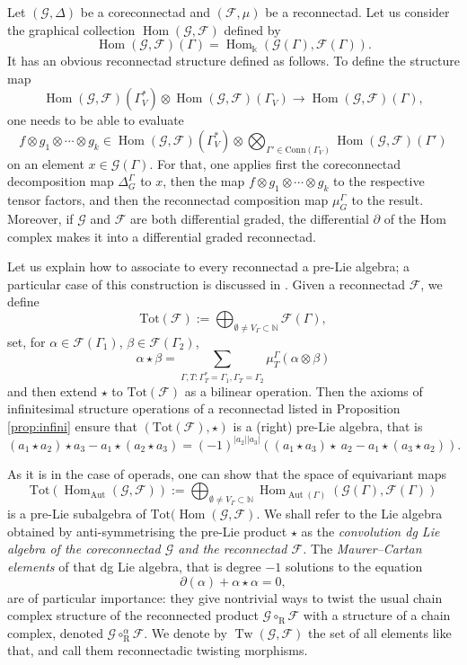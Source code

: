\documentclass[11pt]{article}
\theoremstyle{definition}
\numberwithin{equation}{section}
\newcommand\calF{\mathcal{F}}
\newcommand\calG{\mathcal{G}}
\DeclareMathOperator{\rmR}{\mathrm{R}}
\DeclareMathOperator{\Tw}{Tw}
\DeclareMathOperator{\Aut}{Aut}
\DeclareMathOperator{\Hom}{Hom}
\newcommand\kk{\Bbbk}
\begin{document}
Let $(\calG,\Delta)$ be a coreconnectad and $(\calF,\mu)$ be a reconnectad. Let us consider the graphical collection $\Hom(\calG,\calF)$ defined by
 \[
\Hom(\calG,\calF)(\Gamma)=\Hom_{\kk}(\calG(\Gamma),\calF(\Gamma)). 
 \]
It has an obvious reconnectad structure defined as follows. To define the structure map
 \[
\Hom(\calG,\calF)(\Gamma^*_V)\otimes \Hom(\calG,\calF)(\Gamma_V)\to \Hom(\calG,\calF)(\Gamma),
 \]
one needs to be able to evaluate 
 \[
f\otimes g_1\otimes\cdots\otimes g_k\in \Hom(\calG,\calF)(\Gamma^*_V)\otimes\bigotimes_{\Gamma'\in\mathrm{Conn}(\Gamma_V)} \Hom(\calG,\calF)(\Gamma')
 \]
on an element $x\in\calG(\Gamma)$. For that, one applies first the coreconnectad decomposition map $\Delta_G^\Gamma$ to $x$, then the map $f\otimes g_1\otimes\cdots\otimes g_k$ to the respective tensor factors, and then the reconnectad composition map $\mu_G^\Gamma$ to the result. Moreover, if $\calG$ and $\calF$ are both differential graded, the differential $\partial$ of the Hom complex makes it into a differential graded reconnectad.

Let us explain how to associate to every reconnectad a pre-Lie algebra; a particular case of this construction is discussed in \cite[Rem.~3.1.3]{jlms.12596}. Given a reconnectad $\calF$, we define
 \[
\mathrm{Tot}(\calF):=\bigoplus_{\emptyset\ne V_\Gamma\subset\mathbb{N}}\calF(\Gamma),
 \]
set, for $\alpha\in\calF(\Gamma_1)$, $\beta\in\calF(\Gamma_2)$,
 \[
\alpha\star\beta=\sum_{\Gamma, T\colon \Gamma^*_T=\Gamma_1,\Gamma_T=\Gamma_2}\mu_T^\Gamma(\alpha\otimes\beta)
 \]
and then extend $\star$ to $\mathrm{Tot}(\calF)$ as a bilinear operation. Then the axioms of infinitesimal structure operations of a reconnectad listed in Proposition \ref{prop:infini} ensure that $(\mathrm{Tot}(\calF),\star)$ is a (right) pre-Lie algebra, that is
 \[
(a_1\star a_2)\star a_3-a_1\star(a_2\star a_3)=(-1)^{|a_2||a_3|}((a_1\star a_3)\star\ a_2-a_1\star(a_3\star a_2)).
 \] 

As it is in the case of operads, one can show that the space of equivariant maps 
 \[
\mathrm{Tot}(\Hom_{\Aut}(\calG,\calF)):=\bigoplus_{\emptyset\ne V_\Gamma\subset\mathbb{N}}\Hom_{\Aut(\Gamma)}(\calG(\Gamma),\calF(\Gamma))
 \]
is a pre-Lie subalgebra of $\mathrm{Tot}(\Hom(\calG,\calF)$. We shall refer to the Lie algebra obtained by anti-symmetrising the pre-Lie product $\star$ as the \emph{convolution dg Lie algebra of the coreconnectad $\calG$ and the reconnectad $\calF$. } The \emph{Maurer--Cartan elements} of that dg Lie algebra, that is degree $-1$ solutions to the equation
 \[
\partial(\alpha)+\alpha\star\alpha=0,
 \]
are of particular importance: they give nontrivial ways to twist the usual chain complex structure of the reconnected product $\calG\circ_{\rmR}\calF$ with a structure of a chain complex, denoted $\calG\circ^\alpha_{\rmR}\calF$. We denote by $\Tw(\calG,\calF)$ the set of all elements like that, and call them reconnectadic twisting morphisms.
\end{document}
